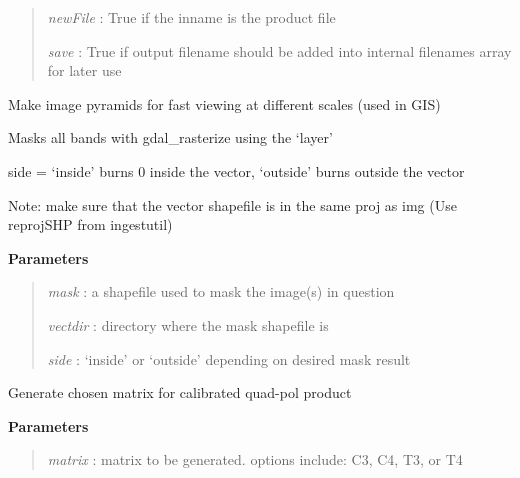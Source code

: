 \documentclass[letterpaper,10pt,openany,oneside]{sphinxmanual}
\begin{document}
\begin{fulllineitems}
\begin{fulllineitems}
\begin{quote}
\emph{newFile} :  True if the inname is the product file

\emph{save}    :  True if output filename should be added into internal filenames array for later use
\end{quote}

\end{fulllineitems}


\begin{fulllineitems}
\label{code:Image.Image.makePyramids}
Make image pyramids for fast viewing at different scales (used in GIS)

\end{fulllineitems}


\begin{fulllineitems}
\label{code:Image.Image.maskImg}
Masks all bands with gdal\_rasterize using the `layer'

side = `inside' burns 0 inside the vector, `outside' burns outside the vector

Note: make sure that the vector shapefile is in the same proj as img (Use reprojSHP from ingestutil)

\textbf{Parameters}
\begin{quote}

\emph{mask}    : a shapefile used to mask the image(s) in question

\emph{vectdir} : directory where the mask shapefile is

\emph{side}    : `inside' or `outside' depending on desired mask result
\end{quote}

\end{fulllineitems}


\begin{fulllineitems}
\label{code:Image.Image.matrix_generation}
Generate chosen matrix for calibrated quad-pol product

\textbf{Parameters}
\begin{quote}

\emph{matrix} : matrix to be generated. options include: C3, C4, T3, or T4
\end{quote}


\end{fulllineitems}
\end{fulllineitems}
\end{document}

